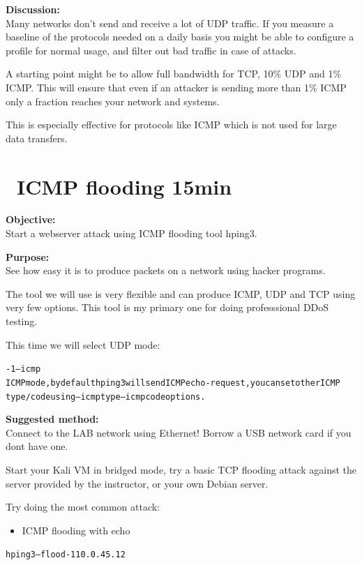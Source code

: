 \documentclass[a4paper,11pt,notitlepage]{report}
\begin{document}
{\bf Discussion:}\\
Many networks don't send and receive a lot of UDP traffic. If you measure a baseline of the protocols needed on a daily basis you might be able to configure a profile for normal usage, and filter out bad traffic in case of attacks.

A starting point might be to allow full bandwidth for TCP, 10\% UDP and 1\% ICMP. This will ensure that even if an attacker is sending more than 1\% ICMP only a fraction reaches your network and systems.

This is especially effective for protocols like ICMP which is not used for large data transfers.

\chapter{\faInfoCircle\ ICMP flooding 15min}

{\bf Objective:}\\
Start a webserver attack using ICMP flooding tool hping3.

{\bf Purpose:}\\
See how easy it is to produce packets on a network using hacker programs.

The tool we will use is very flexible and can produce ICMP, UDP and TCP using very few options. This tool is my primary one for doing professsional DDoS testing.

This time we will select UDP mode:

\begin{alltt}\footnotesize
-1 --icmp
       ICMP  mode,  by  default  hping3  will  send  ICMP echo-request, you can set other ICMP
       type/code using --icmptype --icmpcode options.
\end{alltt}

{\bf Suggested method:}\\
Connect to the LAB network using Ethernet! Borrow a USB network card if you dont have one.

Start your Kali VM in bridged mode, try a basic TCP flooding attack against the server provided by the instructor, or your own Debian server.

Try doing the most common attack:
\begin{itemize}
\item ICMP flooding with echo
\end{itemize}

\begin{alltt}\footnotesize
hping3 --flood -1 10.0.45.12
\end{alltt}
\end{document}
